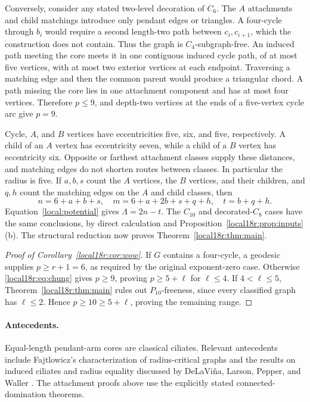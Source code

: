 \documentclass[11pt,a4paper]{article}
\theoremstyle{definition}\newtheorem{definition}[theorem]{Definition}
\theoremstyle{remark}\newtheorem{remark}[theorem]{Remark}
\begin{document}
Conversely, consider any stated two-level decoration of $C_6$.
The $A$ attachments and child matchings introduce only pendant edges or
triangles. A four-cycle through $b_i$ would require a second length-two
path between $c_i,c_{i+1}$, which the construction does not contain.
Thus the graph is $C_4$-subgraph-free.
An induced path meeting the core meets it in one contiguous induced
cycle path, of at most five vertices, with at most two exterior vertices
at each endpoint. Traversing a matching edge and then the common parent
would produce a triangular chord. A path missing the core lies in one
attachment component and has at most four vertices. Therefore $p\le9$,
and depth-two vertices at the ends of a five-vertex cycle arc give
$p=9$.

Cycle, $A$, and $B$ vertices have eccentricities five, six, and five,
respectively. A child of an $A$ vertex has eccentricity seven, while a
child of a $B$ vertex has eccentricity six. Opposite or farthest
attachment classes supply these distances, and matching edges do not
shorten routes between classes. In particular the radius is five.
If $a,b,s$ count the $A$ vertices, the $B$ vertices, and their children,
and $q,h$ count the matching edges on the $A$ and child classes, then
\[
 n=6+a+b+s,\quad m=6+a+2b+s+q+h,\quad t=b+q+h.
\]
Equation~\eqref{local:potential} gives $\Lambda=2n-t$. The $C_{10}$ and decorated-$C_8$
cases have the same conclusions, by direct calculation and
Proposition~\ref{local18r:prop:inputs}(b). The structural reduction now proves
Theorem~\ref{local18r:thm:main}.

\begin{proof}[Proof of Corollary~\ref{local18r:cor:wow}]
If $G$ contains a four-cycle, a geodesic supplies $p\ge r+1=6$, as
required by the original exponent-zero case. Otherwise
\eqref{local18r:eq:chung} gives $p\ge9$, proving $p\ge5+\ell$ for $\ell\le4$.
If $4<\ell\le5$, Theorem~\ref{local18r:thm:main} rules out $P_{10}$-freeness,
since every classified graph has $\ell\le2$. Hence
$p\ge10\ge5+\ell$, proving the remaining range.
\end{proof}




\paragraph{Antecedents.}
Equal-length pendant-arm cores are classical ciliates. Relevant antecedents
include Fajtlowicz's characterization of radius-critical graphs and the
results on induced ciliates and radius equality discussed by DeLaVi\~na,
Larson, Pepper, and Waller \cite{src:fajtlowicz,src:dlpw}.
The attachment proofs above use the explicitly stated connected-domination
theorems.
\end{document}
